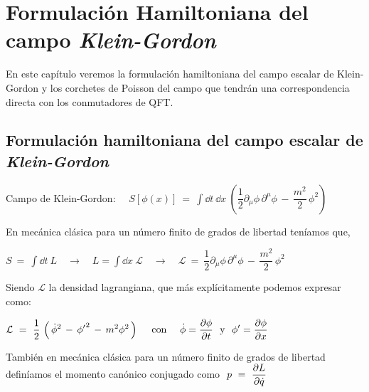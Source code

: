 \chapter{Formulación Hamiltoniana del campo \emph{Klein-Gordon}}
\label{T38}

\vspace{10mm}
\begin{adjustwidth}{50pt}{50pt}
\begin{ejemplo}
\vspace{2mm}
En este capítulo veremos la formulación hamiltoniana del campo escalar de Klein-Gordon y los corchetes de Poisson del campo que tendrán una correspondencia directa con los conmutadores de QFT.
\vspace{2mm}

\end{ejemplo}
\end{adjustwidth}

\vspace{5mm}

\section{Formulación hamiltoniana del campo escalar de 	\emph{Klein-Gordon}}

Campo de Klein-Gordon: $\quad\displaystyle S[\phi(x)] \ = \ \int \dd t \ \dd x \ \left( \dfrac 1 2 \partial_\mu \phi \, \partial^\mu \phi \, - \, \dfrac{m^2}2 \, \phi^2 \right) $

En mecánica clásica para un número finito de grados de libertad teníamos que,

$\displaystyle S \ = \ \int \dd t \ L \quad \to \quad L=\int \dd x \ \mathcal L \quad  \to \quad \mathcal L\ = \ \dfrac 1 2 \partial_\mu \phi \, \partial^\mu \phi \, - \, \dfrac{m^2}2 \, \phi^2$

Siendo $\mathcal L$ la densidad lagrangiana, que más explícitamente podemos expresar como:

$\displaystyle \mathcal L \ = \ \dfrac 1 2 \, \left( \, \dot \phi^2 \, - \, {\phi'}^2 \, - \, m^2 \phi^2 \, \right) \quad \text{ con } \quad \dot \phi=\pdv{\phi}{t} \ \text{ y } \ {\phi'}=\pdv{\phi}{x}$

También en mecánica clásica para un número finito de grados de libertad definíamos el momento canónico conjugado como $\ \displaystyle p \ = \ \pdv{L}{\dot q}$

